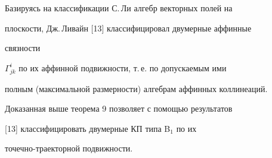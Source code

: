 Базируясь на классификации С.\,Ли алгебр векторных полей на 


плоскости, Дж.\,Ливайн [13] классифицировал двумерные аффинные 


связности 


$\Gamma^i_{j k}$ по их аффинной подвижности, т.\,е. по допускаемым ими 


полным (максимальной размерности) алгебрам аффинных коллинеаций. 


 


Доказанная выше теорема 9 позволяет с помощью результатов 


[13] классифицировать двумерные КП типа B$_1$ по их 


точечно-траекторной подвижности. 


 


